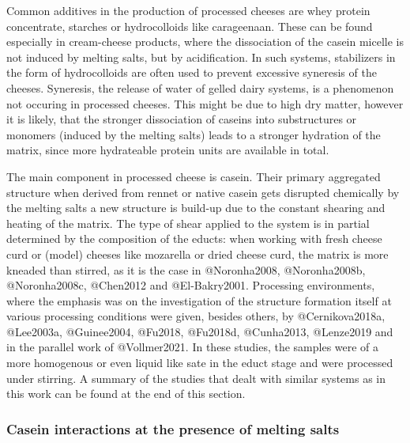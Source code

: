 \documentclass[
]{article}
\begin{document}
Common additives in the production of processed cheeses are whey protein
concentrate, starches or hydrocolloids like carageenaan. These can be
found especially in cream-cheese products, where the dissociation of the
casein micelle is not induced by melting salts, but by acidification. In
such systems, stabilizers in the form of hydrocolloids are often used to
prevent excessive syneresis of the cheeses. Syneresis, the release of
water of gelled dairy systems, is a phenomenon not occuring in processed
cheeses. This might be due to high dry matter, however it is likely,
that the stronger dissociation of caseins into substructures or monomers
(induced by the melting salts) leads to a stronger hydration of the
matrix, since more hydrateable protein units are available in total.

The main component in processed cheese is casein. Their primary
aggregated structure when derived from rennet or native casein gets
disrupted chemically by the melting salts a new structure is build-up
due to the constant shearing and heating of the matrix. The type of
shear applied to the system is in partial determined by the composition
of the educts: when working with fresh cheese curd or (model) cheeses
like mozarella or dried cheese curd, the matrix is more kneaded than
stirred, as it is the case in @Noronha2008, @Noronha2008b,
@Noronha2008c, @Chen2012 and @El-Bakry2001. Processing environments,
where the emphasis was on the investigation of the structure formation
itself at various processing conditions were given, besides others, by
@Cernikova2018a, @Lee2003a, @Guinee2004, @Fu2018, @Fu2018d, @Cunha2013,
@Lenze2019 and in the parallel work of @Vollmer2021. In these studies,
the samples were of a more homogenous or even liquid like sate in the
educt stage and were processed under stirring. A summary of the studies
that dealt with similar systems as in this work can be found at the end
of this section.

\subsubsection{Casein interactions at the presence of melting salts}
\end{document}
